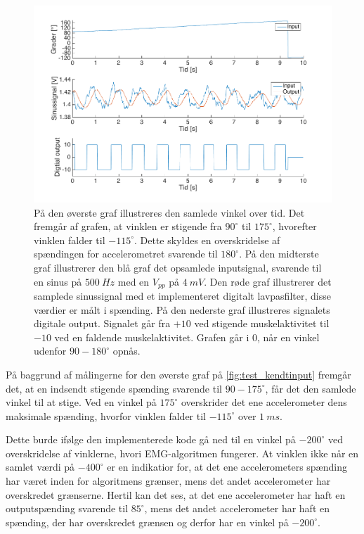 \begin{figure}[H]
\centering
\includegraphics[width=1\textwidth]{figures/kontrol_test_sinus}
\caption{På den øverste graf illustreres den samlede vinkel over tid. Det fremgår af grafen, at vinklen er stigende fra $90^{\circ}$ til $175^{\circ}$, hvorefter vinklen falder til $-115^{\circ}$. Dette skyldes en overskridelse af spændingen for accelerometret svarende til $180^{\circ}$.
På den midterste graf illustrerer den blå graf det opsamlede inputsignal, svarende til en sinus på $500~Hz$ med en $V_{pp}$ på $4~mV$. Den røde graf illustrerer det samplede sinussignal med et implementeret digitalt lavpasfilter, disse værdier er målt i spænding. 
På den nederste graf illustreres signalets digitale output. Signalet går fra $+10$ ved stigende muskelaktivitet til $-10$ ved en faldende muskelaktivitet. Grafen går i $0$, når en vinkel udenfor $90-180^{\circ}$ opnås.}
\label{fig:test_kendtinput}
\end{figure}

\noindent
På baggrund af målingerne for den øverste graf på \autoref{fig:test_kendtinput} fremgår det, at en indsendt stigende spænding svarende til $90-175^{\circ}$, får det den samlede vinkel til at stige. Ved en vinkel på $175^{\circ}$ overskrider det ene accelerometer dens maksimale spænding, hvorfor vinklen falder til $-115^{\circ}$ over $1~ms$. 

Dette burde ifølge den implementerede kode gå ned til en vinkel på $-200^{\circ}$ ved overskridelse af vinklerne, hvori EMG-algoritmen fungerer. 
At vinklen ikke når en samlet værdi på $-400^{\circ}$ er en indikatior for, at det ene accelerometers spænding har været inden for algoritmens grænser, mens det andet accelerometer har overskredet grænserne. Hertil kan det ses, at det ene accelerometer har haft en outputspænding svarende til $85^{\circ}$, mens det andet accelerometer har haft en spænding, der har overskredet grænsen og derfor har en vinkel på $-200^{\circ}$.

